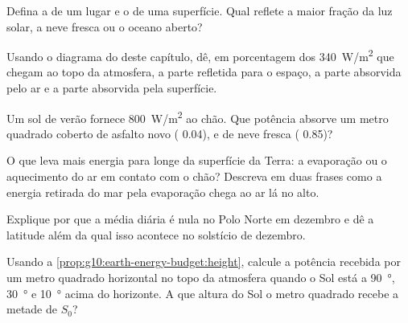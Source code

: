 \begin{exercise}[$\star$]\label{exo:g10:earth-energy-budget:1}
Defina a  de um lugar e o  de uma superfície. Qual reflete a
maior fração da luz solar, a neve fresca ou o oceano aberto?
\end{exercise}

\begin{exercise}[$\star$]\label{exo:g10:earth-energy-budget:2}
Usando o diagrama do  deste capítulo, dê, em porcentagem
dos \qty{340}{W/m^2} que chegam ao topo da atmosfera, a parte refletida para
o espaço, a parte absorvida pelo ar e a parte absorvida pela superfície.
\end{exercise}

\begin{exercise}[$\star$]\label{exo:g10:earth-energy-budget:3}
Um sol de verão fornece \qty{800}{W/m^2} ao chão. Que potência absorve um
metro quadrado coberto de asfalto novo ( 0.04), e de neve fresca
( 0.85)?
\end{exercise}

\begin{exercise}[$\star$]\label{exo:g10:earth-energy-budget:4}
O que leva mais energia para longe da superfície da Terra: a evaporação ou
o aquecimento do ar em contato com o chão? Descreva em duas frases como a
energia retirada do mar pela evaporação chega ao ar lá no alto.
\end{exercise}

\begin{exercise}[$\star$]\label{exo:g10:earth-energy-budget:5}
Explique por que a  média diária é nula no Polo Norte em dezembro
e dê a latitude além da qual isso acontece no solstício de dezembro.
\end{exercise}

\begin{exercise}[$\star\star$]\label{exo:g10:earth-energy-budget:6}
Usando a \cref{prop:g10:earth-energy-budget:height}, calcule a potência
recebida por um metro quadrado horizontal no topo da atmosfera quando o Sol
está a \qty{90}{\degree}, \qty{30}{\degree} e \qty{10}{\degree} acima do
horizonte. A que altura do Sol o metro quadrado recebe a metade de $S_0$?
\end{exercise}

